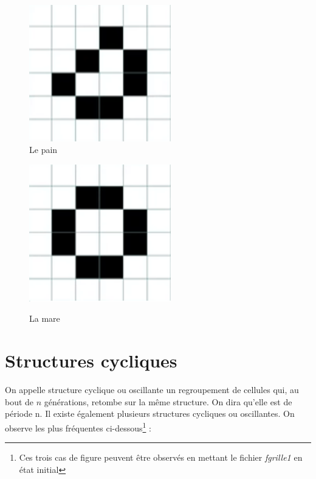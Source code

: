 \documentclass[12,french]{report}
\begin{document}
\begin{figure}[H]
    \begin{minipage}[c]{.46\linewidth}
        \centering
        \includegraphics[width=0.55\textwidth]{./Images/8}\\
        \caption{Le pain}
    \end{minipage}
    \hfill%
    \begin{minipage}[c]{.46\linewidth}
        \centering
        \includegraphics[width=0.55\textwidth]{./Images/9}\\
        \caption{La mare}
    \end{minipage}
\end{figure}\vspace{0.1cm}



\section{Structures cycliques}

On appelle structure cyclique ou oscillante un regroupement de cellules qui, au bout de $n$ générations, retombe sur la même structure. On dira qu'elle est de période n. Il existe également plusieurs structures cycliques ou oscillantes. On observe les plus fréquentes ci-dessous\footnote{Ces trois cas de figure peuvent être observés en mettant le fichier \textit{fgrille1} en état initial} : \vspace{0.3cm}
\end{document}
